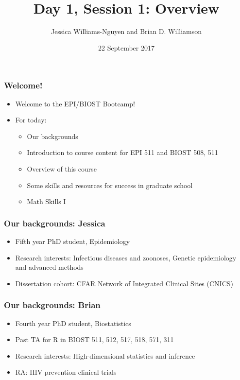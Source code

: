 \documentclass[12pt]{beamer}
\title{Day 1, Session 1: Overview}
\author{Jessica Williams-Nguyen and Brian D. Williamson}
\institute{EPI/BIOST Bootcamp 2017}
\date{22 September 2017}
\newcommand{\myframe}[1]{\begin{frame} \frametitle{#1}}
\newenvironment{spaceitemize}
{ \begin{itemize}
    \setlength{\itemsep}{10pt}
    \setlength{\parskip}{0pt}
    \setlength{\parsep}{0pt}     }
{ \end{itemize}                  }
\begin{document}
\begin{frame}
\titlepage
\end{frame}

\myframe{Welcome!}
\begin{spaceitemize}
\item Welcome to the EPI/BIOST Bootcamp!
\item For today:
\begin{spaceitemize}
\item Our backgrounds
\item Introduction to course content for EPI 511 and BIOST 508, 511
\item Overview of this course
\item Some skills and resources for success in graduate school
\item Math Skills I
\end{spaceitemize}
\end{spaceitemize}
\end{frame}

\myframe{Our backgrounds: Jessica}
\begin{spaceitemize}
\item Fifth year PhD student, Epidemiology
\item Research interests: Infectious diseases and zoonoses, Genetic epidemiology and advanced methods
\item Dissertation cohort: CFAR Network of Integrated Clinical Sites (CNICS)
\end{spaceitemize}
\end{frame}

\myframe{Our backgrounds: Brian}
\centering
\begin{spaceitemize}
\item Fourth year PhD student, Biostatistics
\item Past TA for R in BIOST 511, 512, 517, 518, 571, 311
\item Research interests: High-dimensional statistics and inference
\item RA: HIV prevention clinical trials
\end{spaceitemize}
\end{frame}
\end{document}
